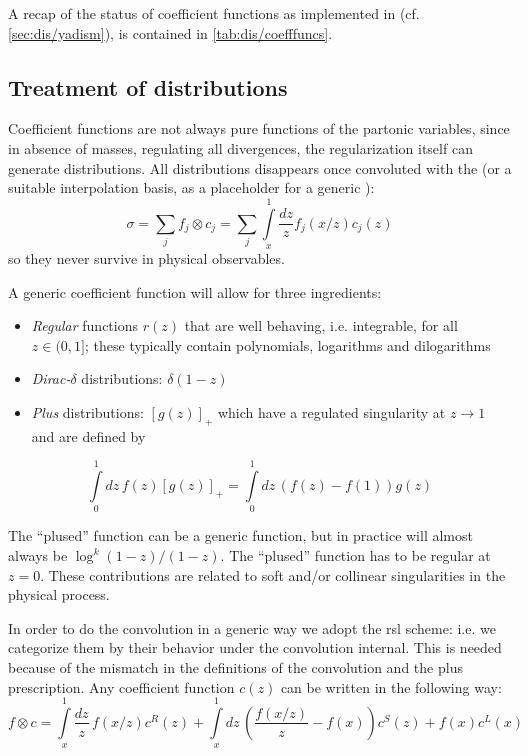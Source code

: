 A recap of the status of coefficient functions as implemented in \yadism (cf.
\cref{sec:dis/yadism}), is contained in \cref{tab:dis/coefffuncs}.




\subsection{Treatment of distributions}
\label{sec:dis/distr}

Coefficient functions are not always pure functions of the partonic variables,
since in absence of masses, regulating all divergences, the regularization
itself can generate distributions.
%
All distributions disappears once convoluted with the \pdf (or a suitable
interpolation basis, as a placeholder for a generic \pdf):
\begin{equation}
    \sigma = \sum_j f_j \otimes c_j = \sum_j \int\limits_x^1 \frac {dz}{z} f_j(x/z) c_j(z)
\end{equation}
so they never survive in physical observables.

A generic coefficient function will allow for three ingredients:
\begin{itemize}
  \item \textit{Regular} functions $r(z)$ that are well behaving, i.e. integrable,
    for all $z \in (0,1]$; these typically contain polynomials, logarithms
    and dilogarithms
  \item \textit{Dirac-$\delta$} distributions: $\delta(1-z)$
  \item \textit{Plus} distributions: $\left[g(z)\right]_+$ which have a
    regulated singularity at $z\to 1$ and are defined by
\end{itemize}

\begin{equation}
  \int\limits_0^1 \!dz\, f(z) \left[g(z)\right]_+ = \int\limits_0^1\!dz\, \left(f(z) - f(1)\right)g(z)
\end{equation}

The \enquote{plused} function can be a generic function, but in practice will
almost always be $\log^k(1-z)/(1-z)$.
The \enquote{plused} function has to be regular at $z=0$.
These contributions are related to soft and/or collinear singularities in the
physical process.

In order to do the convolution in a generic way we adopt the \acrfull{rsl}
scheme: i.e. we categorize them by their behavior under the convolution
internal.
%
This is needed because of the mismatch in the definitions of the convolution
and the plus prescription. Any coefficient function $c(z)$ can be written
in the following way:
\begin{equation}
  f \otimes c = \int\limits_x^1 \! \frac{dz}{z} \, f(x/z) c^R(z) + \int\limits_x^1 \! dz \, \left(\frac{f(x/z)}{z} - f(x)\right) c^S(z) + f(x) c^L(x)
\end{equation}


